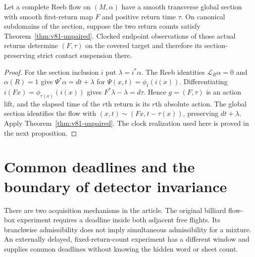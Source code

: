 \begin{corollary}
\label{cor:v81-reeb}
Let a complete Reeb flow on $(M,\alpha)$ have a smooth transverse global
section with smooth first-return map $F$ and positive return time $\tau$.
On canonical subdomains of the section, suppose the two return counts
satisfy Theorem~\ref{thm:v81-unpaired}.  Clocked endpoint observations
of those actual returns determine $(F,\tau)$ on the covered target and
therefore its section-preserving strict contact suspension there.
\end{corollary}
\begin{proof}
For the section inclusion $i$ put $\lambda=i^*\alpha$.  The Reeb
identities $\mathcal L_R\alpha=0$ and $\alpha(R)=1$ give
$\Psi^*\alpha=dt+\lambda$ for $\Psi(x,t)=\phi_t(i(x))$.
Differentiating $i(Fx)=\phi_{\tau(x)}(i(x))$ gives
$F^*\lambda-\lambda=d\tau$.  Hence $g=(F,\tau)$ is an action lift,
and the elapsed time of the $r$th return is its $r$th absolute action.
The global section identifies the flow with
$(x,t)\sim(Fx,t-\tau(x))$, preserving $dt+\lambda$.
Apply Theorem~\ref{thm:v81-unpaired}.  The clock realization used here
is proved in the next proposition.
\end{proof}

\section{Common deadlines and the boundary of detector invariance}
\label{sec:v81-physical}

There are two acquisition mechanisms in the article.  The original
billiard flow-box experiment requires a deadline inside both adjacent
free flights.  Its branchwise admissibility does not imply simultaneous
admissibility for a mixture.  An externally delayed, fixed-return-count
experiment has a different window and supplies common deadlines
without knowing the hidden word or sheet count.

